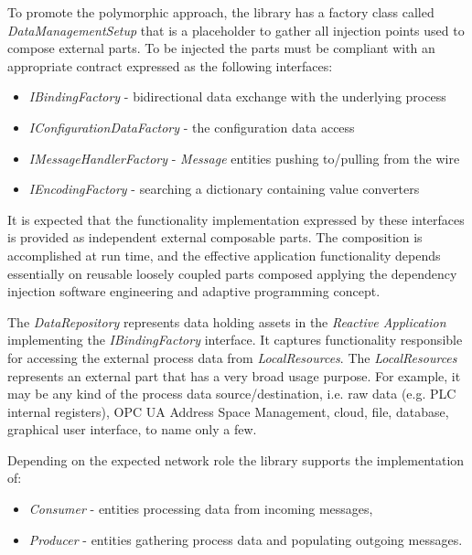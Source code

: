 \documentclass{article}
\begin{document}
To promote the polymorphic approach, the library has a factory class called \emph{DataManagementSetup} that is a placeholder to gather all injection points used to compose external parts. To be injected the parts must be compliant with an appropriate contract expressed as the following interfaces:

\begin{itemize}
      \item \emph{IBindingFactory} - bidirectional data exchange with the underlying process
      \item \emph{IConfigurationDataFactory} - the configuration data access
      \item \emph{IMessageHandlerFactory} - \emph{Message} entities pushing to/pulling from the wire
      \item \emph{IEncodingFactory} - searching a dictionary containing value converters
\end{itemize}

It is expected that the functionality implementation expressed by these interfaces is provided as independent external composable parts. The composition is accomplished at run time, and the effective application functionality depends essentially on reusable loosely coupled parts composed applying the dependency injection software engineering and adaptive programming concept.



The \textit{DataRepository} represents data holding assets in the \textit{Reactive Application} implementing the \textit{IBindingFactory} interface. It captures functionality responsible for accessing the external process data from \textit{LocalResources}. The \textit{LocalResources} represents an external part that has a very broad usage purpose. For example, it may be any kind of the process data source/destination, i.e. raw data (e.g. PLC internal registers), OPC UA Address Space Management, cloud, file, database, graphical user interface, to name only a few.

Depending on the expected network role the library supports the implementation of:

\begin{itemize}
      \item \textit{Consumer} - entities processing data from incoming messages,
      \item \textit{Producer} - entities gathering process data and populating outgoing messages.
\end{itemize}
\end{document}

